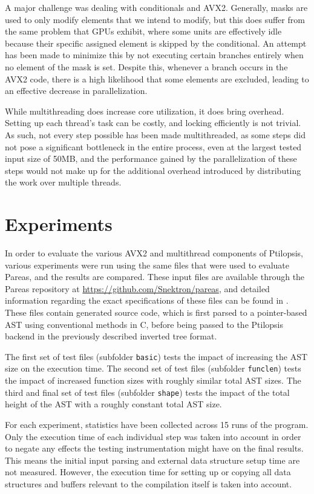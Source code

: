 \documentclass[11pt,dvipsnames]{article}
\newcommand{\mono}[1]{\texttt{#1}}
\newcommand{\Rplus}{\protect\hspace{-.1em}\protect\raisebox{.35ex}{\smaller{\smaller\textbf{+}}}}
\newcommand{\Cpp}{\mbox{C\Rplus\Rplus}\xspace}
\begin{document}
A major challenge was dealing with conditionals and AVX2. Generally, masks are used to only modify elements that we intend to modify, but this does suffer from the same problem that GPUs exhibit, where some units are effectively idle because their specific assigned element is skipped by the conditional. An attempt has been made to minimize this by not executing certain branches entirely when no element of the mask is set. Despite this, whenever a branch occurs in the AVX2 code, there is a high likelihood that some elements are excluded, leading to an effective decrease in parallelization.

While multithreading does increase core utilization, it does bring overhead. Setting up each thread's task can be costly, and locking efficiently is not trivial. As such, not every step possible has been made multithreaded, as some steps did not pose a significant bottleneck in the entire process, even at the largest tested input size of 50MB, and the performance gained by the parallelization of these steps would not make up for the additional overhead introduced by distributing the work over multiple threads.

\section{Experiments} \label{experiments}

In order to evaluate the various AVX2 and multithread components of Ptilopsis, various experiments were run using the same files that were used to evaluate Pareas, and the results are compared. These input files are available through the Pareas repository at \url{https://github.com/Snektron/pareas}, and detailed information regarding the exact specifications of these files can be found in \cite{huijben2021}. These files contain generated source code, which is first parsed to a pointer-based AST using conventional methods in \Cpp, before being passed to the Ptilopsis backend in the previously described inverted tree format.

The first set of test files (subfolder \mono{basic}) tests the impact of increasing the AST size on the execution time. The second set of test files (subfolder \mono{funclen}) tests the impact of increased function sizes with roughly similar total AST sizes. The third and final set of test files (subfolder \mono{shape}) tests the impact of the total height of the AST with a roughly constant total AST size.

For each experiment, statistics have been collected across 15 runs of the program. Only the execution time of each individual step was taken into account in order to negate any effects the testing instrumentation might have on the final results. This means the initial input parsing and external data structure setup time are not measured. However, the execution time for setting up or copying all data structures and buffers relevant to the compilation itself is taken into account.
\end{document}
